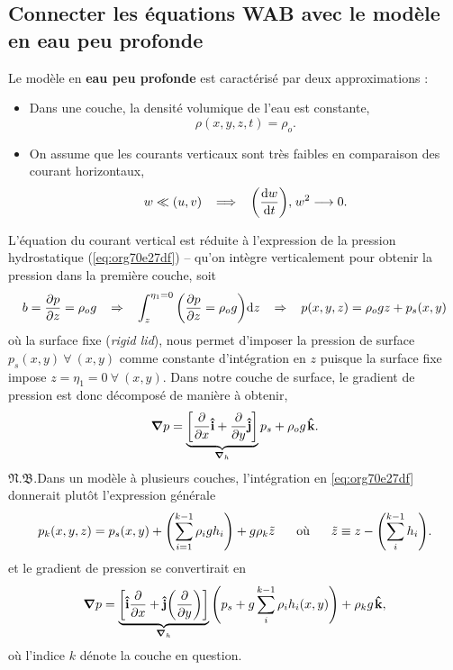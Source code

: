 \documentclass[10pt]{report}
\numberwithin{equation}{section}
\newcommand{\ivf}{\vb{\hat{i}}}
\newcommand{\jvf}{\vb{\hat{j}}}
\newcommand{\kvf}{\vb{\hat{k}}}
\newcommand{\pt}{\hspace{1pt}} %
\newcommand{\nb}{\underline{{\footnotesize\EightStarConvex}\pt $\mathfrak{N.B.}$\vphantom{p}}\hspace{3pt}}
\begin{document}
\subsection{Connecter les équations WAB avec le modèle en eau peu profonde}
\label{sec:orgb76d636}

Le modèle en \textbf{eau peu profonde} est caractérisé par deux approximations :
\begin{itemize}
\item Dans une couche, la densité volumique de l'eau est constante,
\begin{equation}
   \rho(x,y,z,t) = \rho_o.   
\end{equation}

\item On assume que les courants verticaux sont très faibles en comparaison des courant horizontaux,
\begin{equation}
   w \ll (u,v) \hspace{0.3cm} \Longrightarrow \hspace{0.3cm} \qty(\dv{w}{t}),\pt w^2 \longrightarrow 0.
\end{equation}
\end{itemize}
L'équation du courant vertical est réduite à l'expression de la pression hydrostatique (\ref{eq:org70e27df}) -- qu'on intègre verticalement pour obtenir la pression dans la première couche, soit
\begin{equation}
\label{eq:org70e27df}
   b = \pdv{p}{z} = \rho_o g \hspace{0.3cm}
   \Rightarrow \hspace{0.3cm} \int_{z}^{\eta_1=0} \qty( \pdv{p}{z} = \rho_o g ) \dd z \hspace{0.3cm}
   \Rightarrow \hspace{0.3cm} p(x,y,z) = \rho_o gz + p_s(x,y)
\end{equation}
où la surface fixe (\emph{rigid lid}), nous permet d'imposer la pression de surface \(p_s(x,y)\ \forall \ (x,y)\) comme constante d'intégration en \(z\) puisque la surface fixe impose \(z=\eta_1=0\ \forall\ (x,y)\).
Dans notre couche de surface, le gradient de pression est donc décomposé de manière à obtenir,
\begin{equation}
   \gradient{p} = \underbrace{\qty[\pdv{}{x}\ivf + \pdv{}{y} \jvf]}_{\gradient_h }p_s + \rho_o g \pt\kvf.
\end{equation}
\nb Dans un modèle à plusieurs couches, l'intégration en \ref{eq:org70e27df} donnerait plutôt l'expression générale
\begin{equation}
   p_k(x,y,z) = p_s(x,y) + \qty(\sum_{i=1}^{k-1} \rho_i g h_i) + g\rho_k \tilde{z}
   \hspace{0.6cm} \text{où}\hspace{0.6cm}
   \tilde{z}\equiv z-\qty(\sum_i^{k-1} h_i).
\end{equation}
et le gradient de pression se convertirait en
\begin{equation}
   \gradient{p} = \underbrace{\qty[\ivf\pdv{}{x} + \jvf\qty(\pdv{}{y})]}_{\gradient_h }\qty(p_s + g \sum_i^{k-1} \rho_i h_i(x,y))
   +\rho_k g \pt\kvf,
\end{equation}
où l'indice \(k\) dénote la couche en question.\bigskip
\end{document}
